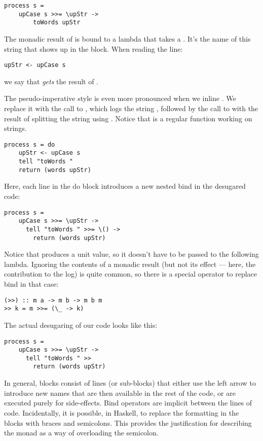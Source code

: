\begin{Verbatim}
process s = 
    upCase s >>= \upStr ->
        toWords upStr
\end{Verbatim}
The monadic result of  is bound to a lambda that takes a
. It's the name of this string that shows up in the
 block. When reading the line:

\begin{Verbatim}
upStr <- upCase s
\end{Verbatim}
we say that  \emph{gets} the result of .

The pseudo-imperative style is even more pronounced when we inline
. We replace it with the call to , which
logs the string , followed by the call to
 with the result of splitting the string 
using . Notice that  is a regular function
working on strings.

\begin{Verbatim}
process s = do
    upStr <- upCase s
    tell "toWords "
    return (words upStr)
\end{Verbatim}
Here, each line in the do block introduces a new nested bind in the
desugared code:

\begin{Verbatim}
process s =
    upCase s >>= \upStr ->
      tell "toWords " >>= \() ->
        return (words upStr)
\end{Verbatim}
Notice that  produces a unit value, so it doesn't have to
be passed to the following lambda. Ignoring the contents of a monadic
result (but not its effect --- here, the contribution to the log) is
quite common, so there is a special operator to replace bind in that
case:

\begin{Verbatim}
(>>) :: m a -> m b -> m b m
>> k = m >>= (\_ -> k)
\end{Verbatim}
The actual desugaring of our code looks like this:

\begin{Verbatim}
process s =
    upCase s >>= \upStr ->
      tell "toWords " >>
        return (words upStr)
\end{Verbatim}
In general,  blocks consist of lines (or sub-blocks) that
either use the left arrow to introduce new names that are then available
in the rest of the code, or are executed purely for side-effects. Bind
operators are implicit between the lines of code. Incidentally, it is
possible, in Haskell, to replace the formatting in the 
blocks with braces and semicolons. This provides the justification for
describing the monad as a way of overloading the semicolon.

